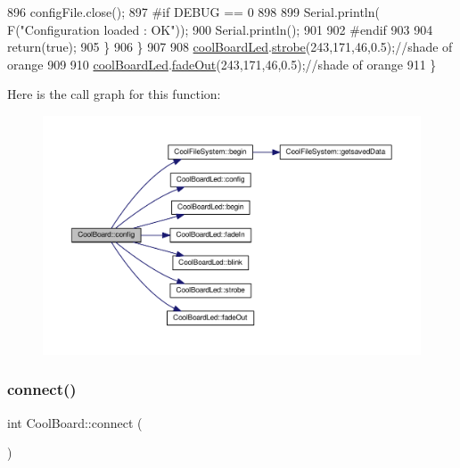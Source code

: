 \begin{DoxyCode}
896             configFile.close();
897 \textcolor{preprocessor}{            #if DEBUG == 0}
898 
899                 Serial.println( F(\textcolor{stringliteral}{"Configuration loaded : OK"}));
900                 Serial.println();
901 
902 \textcolor{preprocessor}{            #endif}
903 
904             \textcolor{keywordflow}{return}(\textcolor{keyword}{true});
905         \}
906     \}
907 
908     \hyperlink{class_cool_board_a1b1d3c684a5baa56b08486e192fd8e97}{coolBoardLed}.\hyperlink{class_cool_board_led_ad5f0de4c628cbfbf49896042831c64ad}{strobe}(243,171,46,0.5);\textcolor{comment}{//shade of orange}
909     
910     \hyperlink{class_cool_board_a1b1d3c684a5baa56b08486e192fd8e97}{coolBoardLed}.\hyperlink{class_cool_board_led_a93d545679237e8cc858324367149775c}{fadeOut}(243,171,46,0.5);\textcolor{comment}{//shade of orange               }
911 \}
\end{DoxyCode}
Here is the call graph for this function\+:\nopagebreak
\begin{figure}[H]
\begin{center}
\leavevmode
\includegraphics[width=350pt]{d7/df9/class_cool_board_a583a874c09c07e70a6eb9229fc4beddb_cgraph}
\end{center}
\end{figure}
\mbox{\label{class_cool_board_a519de78b807f8ec6463ff484eb925918}} 
\subsubsection{\texorpdfstring{connect()}{connect()}}
{\footnotesize\ttfamily int Cool\+Board\+::connect (\begin{DoxyParamCaption}{ }\end{DoxyParamCaption})}

